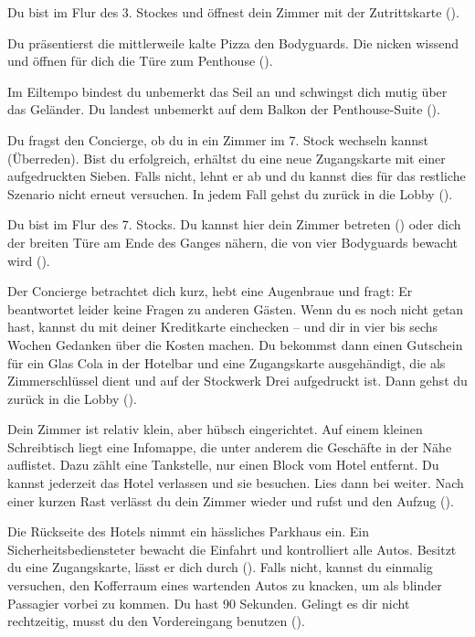 {	%
	Du bist im Flur des 3. Stockes und öffnest dein Zimmer mit der Zutrittskarte ().

	Du präsentierst die mittlerweile kalte Pizza den Bodyguards. Die nicken wissend und öffnen für dich die Türe zum Penthouse ().

	Im Eiltempo bindest du unbemerkt das Seil an und schwingst dich mutig über das Geländer. Du landest unbemerkt auf dem Balkon der Penthouse-Suite ().

	Du fragst den Concierge, ob du in ein Zimmer im 7. Stock wechseln kannst  (Überreden). Bist du erfolgreich, erhältst du eine neue Zugangskarte mit einer aufgedruckten Sieben. Falls nicht, lehnt er ab und du kannst dies für das restliche Szenario nicht erneut versuchen. In jedem Fall gehst du zurück in die Lobby ().

	Du bist im Flur des 7. Stocks. Du kannst hier dein Zimmer betreten () oder dich der breiten Türe am Ende des Ganges nähern, die von vier Bodyguards bewacht wird ().

	Der Concierge betrachtet dich kurz, hebt eine Augenbraue und fragt:  Er beantwortet leider keine Fragen zu anderen Gästen. Wenn du es noch nicht getan hast, kannst du mit deiner Kreditkarte einchecken -- und dir in vier bis sechs Wochen Gedanken über die Kosten machen. Du bekommst dann einen Gutschein für ein Glas Cola in der Hotelbar und eine Zugangskarte ausgehändigt, die als Zimmerschlüssel dient und auf der Stockwerk Drei aufgedruckt ist. Dann gehst du zurück in die Lobby ().

	Dein Zimmer ist relativ klein, aber hübsch eingerichtet. Auf einem kleinen Schreibtisch liegt eine Infomappe, die unter anderem die Geschäfte in der Nähe auflistet. Dazu zählt eine Tankstelle, nur einen Block vom Hotel entfernt. Du kannst jederzeit das Hotel verlassen und sie besuchen. Lies dann bei  weiter. Nach einer kurzen Rast verlässt du dein Zimmer wieder und rufst und den Aufzug ().

	Die Rückseite des Hotels nimmt ein hässliches Parkhaus ein. Ein Sicherheitsbediensteter bewacht die Einfahrt und kontrolliert alle Autos. Besitzt du eine Zugangskarte, lässt er dich durch (). Falls nicht, kannst du einmalig versuchen, den Kofferraum eines wartenden Autos zu knacken, um als blinder Passagier vorbei zu kommen. Du hast 90 Sekunden. Gelingt es dir nicht rechtzeitig, musst du den Vordereingang benutzen ().

}
